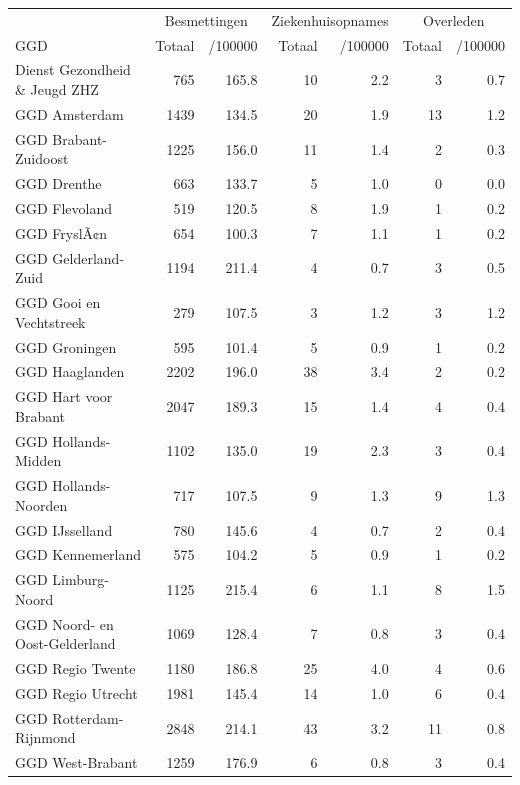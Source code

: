 \documentclass[
  english,
  man,floatsintext]{apa6}
\begin{document}
\begin{table}
\centering\begingroup\fontsize{10}{12}\selectfont

\begin{threeparttable}
\begin{tabular}{lrrrrrr}
\toprule
\multicolumn{1}{c}{ } & \multicolumn{2}{c}{Besmettingen} & \multicolumn{2}{c}{Ziekenhuisopnames} & \multicolumn{2}{c}{Overleden} \\
\cmidrule(l{3pt}r{3pt}){2-3} \cmidrule(l{3pt}r{3pt}){4-5} \cmidrule(l{3pt}r{3pt}){6-7}
GGD & Totaal & /100000 & Totaal & /100000 & Totaal & /100000\\
\midrule
Dienst Gezondheid \& Jeugd ZHZ & 765 & 165.8 & 10 & 2.2 & 3 & 0.7\\
GGD Amsterdam & 1439 & 134.5 & 20 & 1.9 & 13 & 1.2\\
GGD Brabant-Zuidoost & 1225 & 156.0 & 11 & 1.4 & 2 & 0.3\\
GGD Drenthe & 663 & 133.7 & 5 & 1.0 & 0 & 0.0\\
GGD Flevoland & 519 & 120.5 & 8 & 1.9 & 1 & 0.2\\
GGD FryslÃ¢n & 654 & 100.3 & 7 & 1.1 & 1 & 0.2\\
GGD Gelderland-Zuid & 1194 & 211.4 & 4 & 0.7 & 3 & 0.5\\
GGD Gooi en Vechtstreek & 279 & 107.5 & 3 & 1.2 & 3 & 1.2\\
GGD Groningen & 595 & 101.4 & 5 & 0.9 & 1 & 0.2\\
GGD Haaglanden & 2202 & 196.0 & 38 & 3.4 & 2 & 0.2\\
GGD Hart voor Brabant & 2047 & 189.3 & 15 & 1.4 & 4 & 0.4\\
GGD Hollands-Midden & 1102 & 135.0 & 19 & 2.3 & 3 & 0.4\\
GGD Hollands-Noorden & 717 & 107.5 & 9 & 1.3 & 9 & 1.3\\
GGD IJsselland & 780 & 145.6 & 4 & 0.7 & 2 & 0.4\\
GGD Kennemerland & 575 & 104.2 & 5 & 0.9 & 1 & 0.2\\
GGD Limburg-Noord & 1125 & 215.4 & 6 & 1.1 & 8 & 1.5\\
GGD Noord- en Oost-Gelderland & 1069 & 128.4 & 7 & 0.8 & 3 & 0.4\\
GGD Regio Twente & 1180 & 186.8 & 25 & 4.0 & 4 & 0.6\\
GGD Regio Utrecht & 1981 & 145.4 & 14 & 1.0 & 6 & 0.4\\
GGD Rotterdam-Rijnmond & 2848 & 214.1 & 43 & 3.2 & 11 & 0.8\\
GGD West-Brabant & 1259 & 176.9 & 6 & 0.8 & 3 & 0.4\\

\end{tabular}
\end{threeparttable}
\end{table}
\end{document}
